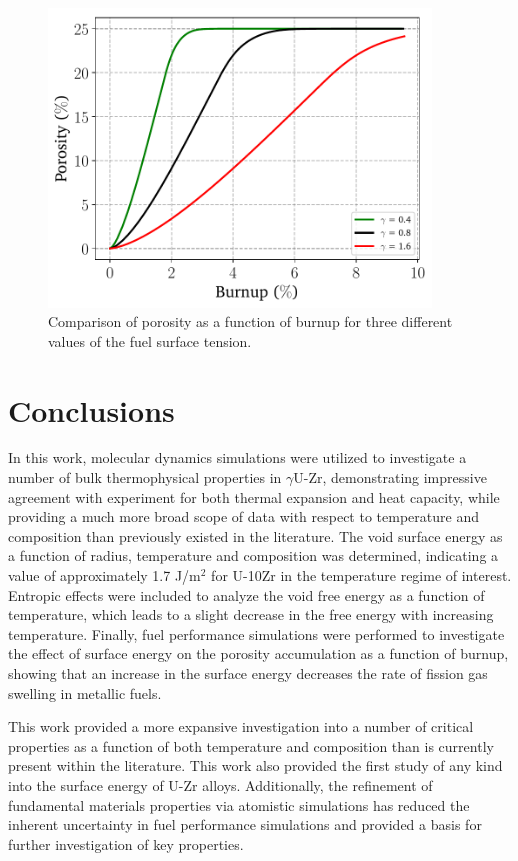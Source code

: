 \documentclass[review]{elsarticle}
\begin{document}
\begin{figure}[!htp]
\begin{center}
\includegraphics[keepaspectratio, width=4.0in]{11_plot_porosity_var_gamma}
\end{center}
\caption{Comparison of porosity as a function of burnup for three different values of the fuel surface tension.}
\label{fig:plot_porosity_var_gamma}
\end{figure}

\FloatBarrier

\section{Conclusions}

In this work, molecular dynamics simulations were utilized to investigate a number of bulk thermophysical properties in $\gamma$U-Zr, demonstrating impressive agreement with experiment for both thermal expansion and heat capacity, while providing a much more broad scope of data with respect to temperature and composition than previously existed in the literature. The void surface energy as a function of radius, temperature and composition was determined, indicating a value of approximately 1.7 J/m$^2$ for U-10Zr in the temperature regime of interest. Entropic effects were included to analyze the void free energy as a function of temperature, which leads to a slight decrease in the free energy with increasing temperature. Finally, fuel performance simulations were performed to investigate the effect of surface energy on the porosity accumulation as a function of burnup, showing that an increase in the surface energy decreases the rate of fission gas swelling in metallic fuels. 

This work provided a more expansive investigation into a number of critical properties as a function of both temperature and composition than is currently present within the literature. This work also provided the first study of any kind into the surface energy of U-Zr alloys. Additionally, the refinement of fundamental materials properties via atomistic simulations has reduced the inherent uncertainty in fuel performance simulations and provided a basis for further investigation of key properties.
\end{document}
